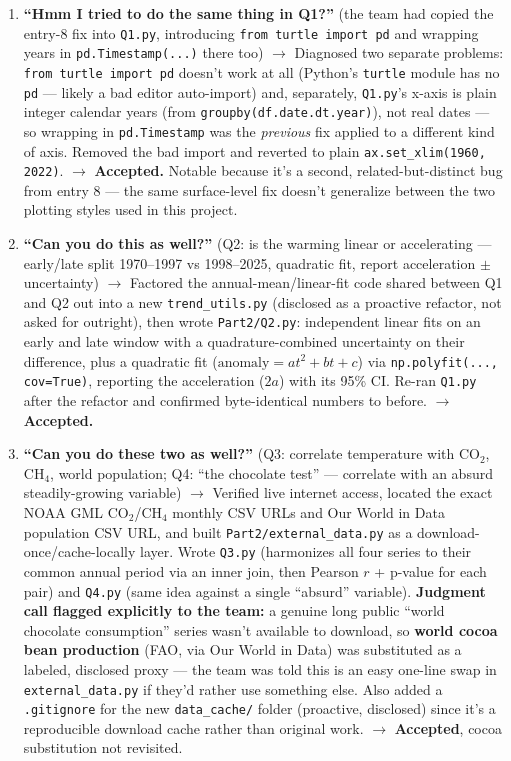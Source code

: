 \begin{enumerate}[leftmargin=*, itemsep=0.8em]
\item \textbf{``Hmm I tried to do the same thing in Q1?''} (the team had copied the entry-8
fix into \texttt{Q1.py}, introducing \texttt{from turtle import pd} and wrapping years in
\texttt{pd.Timestamp(...)} there too)
$\rightarrow$ Diagnosed two separate problems: \texttt{from turtle import pd} doesn't work
at all (Python's \texttt{turtle} module has no \texttt{pd} --- likely a bad editor
auto-import) and, separately, \texttt{Q1.py}'s x-axis is plain integer calendar years (from
\texttt{groupby(df.date.dt.year)}), not real dates --- so wrapping in \texttt{pd.Timestamp}
was the \emph{previous} fix applied to a different kind of axis. Removed the bad import and
reverted to plain \texttt{ax.set\_xlim(1960, 2022)}.
$\rightarrow$ \textbf{Accepted.} Notable because it's a second, related-but-distinct bug from
entry 8 --- the same surface-level fix doesn't generalize between the two plotting styles
used in this project.

\item \textbf{``Can you do this as well?''} (Q2: is the warming linear or accelerating ---
early/late split 1970--1997 vs 1998--2025, quadratic fit, report acceleration $\pm$
uncertainty)
$\rightarrow$ Factored the annual-mean/linear-fit code shared between Q1 and Q2 out into a
new \texttt{trend\_utils.py} (disclosed as a proactive refactor, not asked for outright),
then wrote \texttt{Part2/Q2.py}: independent linear fits on an early and late window with a
quadrature-combined uncertainty on their difference, plus a quadratic fit
($\text{anomaly} = a t^2 + b t + c$) via \texttt{np.polyfit(..., cov=True)}, reporting the
acceleration ($2a$) with its 95\% CI. Re-ran \texttt{Q1.py} after the refactor and confirmed
byte-identical numbers to before.
$\rightarrow$ \textbf{Accepted.}

\item \textbf{``Can you do these two as well?''} (Q3: correlate temperature with CO$_2$,
CH$_4$, world population; Q4: ``the chocolate test'' --- correlate with an absurd
steadily-growing variable)
$\rightarrow$ Verified live internet access, located the exact NOAA GML CO$_2$/CH$_4$
monthly CSV URLs and Our World in Data population CSV URL, and built
\texttt{Part2/external\_data.py} as a download-once/cache-locally layer. Wrote
\texttt{Q3.py} (harmonizes all four series to their common annual period via an inner join,
then Pearson $r$ + p-value for each pair) and \texttt{Q4.py} (same idea against a single
``absurd'' variable).
\textbf{Judgment call flagged explicitly to the team:} a genuine long public ``world
chocolate consumption'' series wasn't available to download, so \textbf{world cocoa bean
production} (FAO, via Our World in Data) was substituted as a labeled, disclosed proxy ---
the team was told this is an easy one-line swap in \texttt{external\_data.py} if they'd
rather use something else.
Also added a \texttt{.gitignore} for the new \texttt{data\_cache/} folder (proactive,
disclosed) since it's a reproducible download cache rather than original work.
$\rightarrow$ \textbf{Accepted}, cocoa substitution not revisited.


\end{enumerate}

